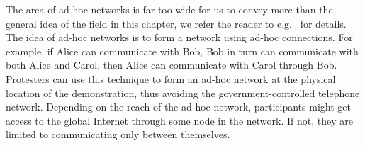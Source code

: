 The area of ad-hoc networks is far too wide for us to convey more than the 
general idea of the field in this chapter, we refer the reader to e.g.\ 
\textcite{AdHocNetworksBook} for details.
The idea of ad-hoc networks is to form a network using ad-hoc connections.
For example, if Alice can communicate with Bob, Bob in turn can communicate 
with both Alice and Carol, then Alice can communicate with Carol through Bob.
Protesters can use this technique to form an ad-hoc network at the physical 
location of the demonstration, thus avoiding the government-controlled 
telephone network.
Depending on the reach of the ad-hoc network, participants might get access to 
the global Internet through some node in the network.
If not, they are limited to communicating only between themselves.

